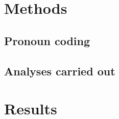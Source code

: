   \section{Methods}
    \subsection{Pronoun coding}
    \subsection{Analyses carried out}
  \section{Results}
